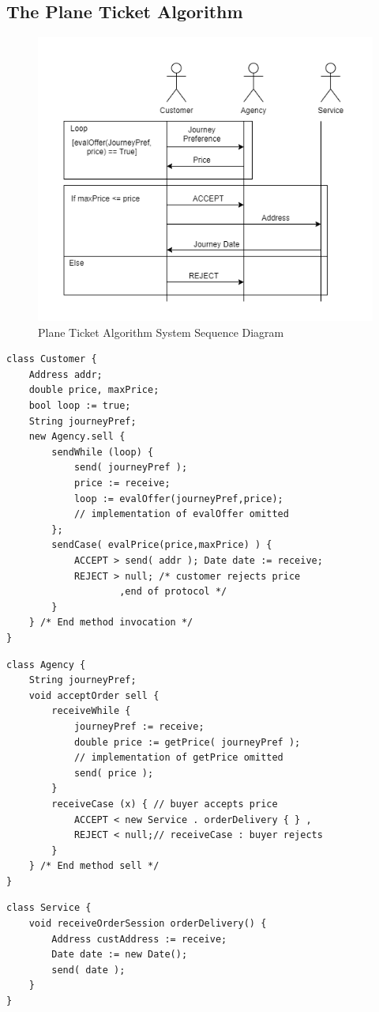 \documentclass[runningheads]{llncs}
\begin{document}
\subsection{The Plane Ticket Algorithm}
\begin{figure}
\centering
\includegraphics[scale=0.4]{Algorithm.png}
\caption{Plane Ticket Algorithm System Sequence Diagram}
\end{figure}
\begin{lstlisting}[caption={Customer Algorithm},captionpos=b]
class Customer {
	Address addr;
	double price, maxPrice;
	bool loop := true;
	String journeyPref;
	new Agency.sell {
		sendWhile (loop) {
			send( journeyPref );
			price := receive;
			loop := evalOffer(journeyPref,price);
			// implementation of evalOffer omitted
		};
		sendCase( evalPrice(price,maxPrice) ) {
			ACCEPT > send( addr ); Date date := receive;
			REJECT > null; /* customer rejects price
					,end of protocol */ 
		}
	} /* End method invocation */
}
\end{lstlisting}
\newpage
\begin{lstlisting}[caption={Agency Algorithm},captionpos=b]
class Agency {
	String journeyPref;
	void acceptOrder sell {
		receiveWhile {
			journeyPref := receive;
			double price := getPrice( journeyPref );
			// implementation of getPrice omitted
			send( price );
		}
		receiveCase (x) { // buyer accepts price
			ACCEPT < new Service . orderDelivery { } ,
			REJECT < null;// receiveCase : buyer rejects 
        }
	} /* End method sell */
}
\end{lstlisting}
\begin{lstlisting}[caption={Service Algorithm},captionpos=b]
class Service {
	void receiveOrderSession orderDelivery() {
		Address custAddress := receive;
		Date date := new Date();
		send( date );
	}
}
\end{lstlisting}
\end{document}
